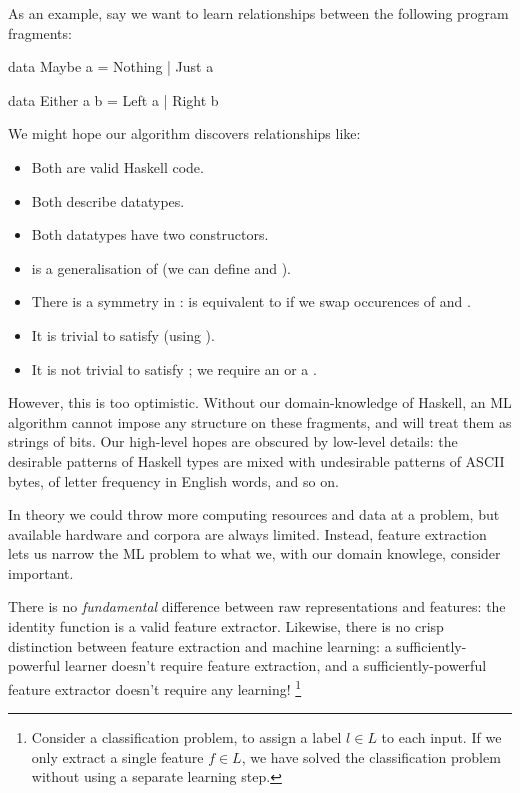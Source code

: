 As an example, say we want to learn relationships between the following program fragments:

\begin{haskell}
data Maybe a = Nothing | Just a

data Either a b = Left a | Right b
\end{haskell}

We might hope our algorithm discovers relationships like:

\begin{itemize}
  \item Both are valid Haskell code.
  \item Both describe datatypes.
  \item Both datatypes have two constructors.
  \item {} is a generalisation of  (we can define  and ).
  \item There is a symmetry in :  is equivalent to  if we swap occurences of  and .
  \item It is trivial to satisfy  (using ).
  \item It is not trivial to satisfy ; we require an  or a .
\end{itemize}

However, this is too optimistic. Without our domain-knowledge of Haskell, an ML algorithm cannot impose any structure on these fragments, and will treat them as strings of bits. \iffalse TODO: It depends on your feature extraction, and why bits? \fi Our high-level hopes are obscured by low-level details: the desirable patterns of Haskell types are mixed with undesirable patterns of ASCII bytes, of letter frequency in English words, and so on.
\iffalse TODO: I do not see this has to be this way\fi

In theory we could throw more computing resources and data at a problem, but available hardware and corpora are always limited. Instead, feature extraction lets us narrow the ML problem to what we, with our domain knowlege, consider important.

There is no \emph{fundamental} difference between raw representations and features: the identity function is a valid feature extractor. Likewise, there is no crisp distinction between feature extraction and machine learning: a sufficiently-powerful learner doesn't require feature extraction, and a sufficiently-powerful feature extractor doesn't require any learning! \iffalse TODO: not sure that's the right argument for a more-or-less common observation that ML & FE are coming together \fi \footnote{Consider a classification problem, to assign a label $l \in L$ to each input. If we only extract a single feature $f \in L$, we have solved the classification problem without using a separate learning step.}

